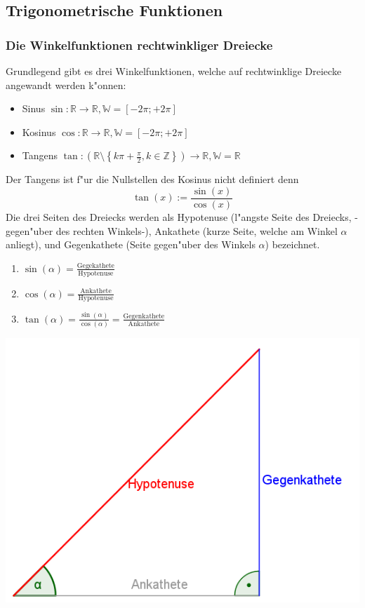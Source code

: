 \subsection{Trigonometrische Funktionen}
\subsubsection{Die Winkelfunktionen rechtwinkliger Dreiecke}
Grundlegend gibt es drei Winkelfunktionen, welche auf rechtwinklige Dreiecke angewandt werden k"onnen:
\begin{itemize}
\item Sinus $\sin : \mathbb{R} \to \mathbb{R}, \mathbb{W} = \left[-2\pi;+2\pi \right]$
\item Kosinus $\cos : \mathbb{R} \to \mathbb{R}, \mathbb{W} = \left[ -2\pi;+2 \pi \right]$
\item Tangens $\tan : \left( \mathbb{R} \setminus \left\{ k \pi + \frac{\pi}{2}, k \in \mathbb{Z} \right\} \right) \to \mathbb{R}, \mathbb{W} = \mathbb{R}$
\end{itemize}
Der Tangens ist f"ur die Nullstellen des Kosinus nicht definiert denn
\begin{equation*}
\tan(x) := \frac{\sin(x)}{\cos(x)}
\end{equation*}
Die drei Seiten des Dreiecks werden als Hypotenuse (l"angste Seite des Dreiecks, -gegen"uber des rechten Winkels-), Ankathete (kurze Seite, welche am Winkel $\alpha$ anliegt), und Gegenkathete (Seite gegen"uber des Winkels $\alpha$) bezeichnet.
\begin{minipage}{0.45\textwidth}
\hfill
\begin{enumerate}
\item $\sin(\alpha)=\frac{\text{Gegekathete}}{\text{Hypotenuse}}$
\item $\cos(\alpha)=\frac{\text{Ankathete}}{\text{Hypotenuse}}$
\item $\tan(\alpha)=\frac{\sin(\alpha)}{\cos(\alpha)}= \frac{\text{Gegenkathete}}{\text{Ankathete}}$
\end{enumerate}
\end{minipage}
\begin{minipage}{0.45\textwidth}
\includegraphics[width=1.0\textwidth]{pictures/TrigonDreieck}
\end{minipage}

